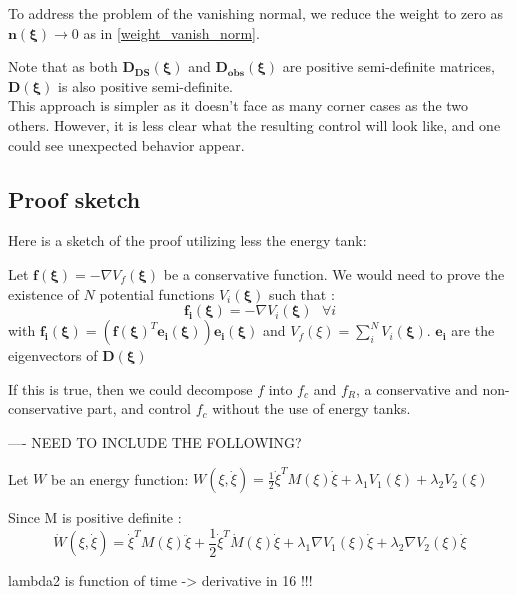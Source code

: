 To address the problem of the vanishing normal, we reduce the weight to zero as $\boldsymbol n(\boldsymbol\xi) \rightarrow 0$ as in \eqref{weight_vanish_norm}.

Note that as both $\boldsymbol{D_{DS}}(\boldsymbol\xi)$ and $\boldsymbol{D_{obs}}(\boldsymbol\xi)$ are positive semi-definite matrices, $\boldsymbol D(\boldsymbol\xi)$ is also positive semi-definite.\\

This approach is simpler as it doesn't face as many corner cases as the two others. However, it is less clear what the resulting control will look like, and one could see unexpected behavior appear.

\subsection{Proof sketch}
Here is a sketch of the proof utilizing less the energy tank: 

Let $\boldsymbol f(\boldsymbol\xi) = -\nabla V_f(\boldsymbol\xi)$ be a conservative function.
We would need to prove the existence of $N$ potential functions $V_i(\boldsymbol\xi)$ such that :
\begin{equation}
    \boldsymbol{f_i}(\boldsymbol\xi) = -\nabla V_i(\boldsymbol\xi) \text{  } \forall i
\end{equation}
with $\boldsymbol{f_i}(\boldsymbol\xi) = (\boldsymbol f(\boldsymbol\xi)^T\boldsymbol{e_i}(\boldsymbol\xi))\boldsymbol{e_i}(\boldsymbol\xi)$ and $V_f(\xi) = \sum_i^N V_i(\boldsymbol\xi)$. $\boldsymbol{e_i}$ are the eigenvectors of $\boldsymbol D(\boldsymbol\xi)$ 

If this is true, then we could decompose $f$ into $f_c$ and $f_R$, a conservative and non-conservative part, and control $f_c$ without the use of energy tanks.

----
NEED TO INCLUDE THE FOLLOWING?

Let $W$ be an energy function: 
$W(\xi, \dot\xi) = \frac{1}{2}\dot\xi^T M(\xi)\dot\xi + \lambda_1 V_1(\xi) + \lambda_2 V_2(\xi)$

Since M is positive definite : 
\begin{equation}
    \dot W(\xi, \dot\xi) = \dot\xi^T M(\xi)\ddot\xi + \frac{1}{2}\dot\xi^T \dot M(\xi)\dot\xi + \lambda_1 \nabla V_1(\xi) \dot\xi + \lambda_2 \nabla V_2(\xi) \dot\xi
\end{equation}

lambda2 is function of time -> derivative in 16 !!!

